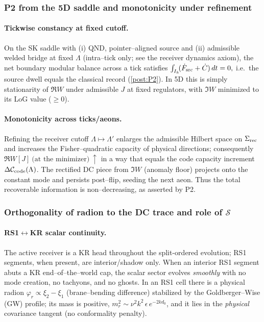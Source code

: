 \documentclass[10pt]{article}
\theoremstyle{definition}
\theoremstyle{plain}
\begin{document}
\subsubsection*{P2 from the 5D saddle and monotonicity under refinement}
\label{subsubsec:P2-from-5D}

\paragraph{Tickwise constancy at fixed cutoff.}\label{par:uom-main-084}
On the SK saddle with (i) QND, pointer–aligned source and (ii) admissible welded bridge at fixed $\Lambda$
(intra--tick only; see the receiver dynamics axiom), the net boundary modular balance across a tick satisfies
\(
\int_{I_k}\! (\dot F_{\rm src}+\dot C)\,dt = 0,
\)
i.e.\ the source dwell equals the classical record (\ref{post:P2}).
In 5D this is simply stationarity of $\Re W$ under admissible $J$ at fixed regulators, with $\Im W$ minimized to its LoG value ($\ge 0$).

\paragraph{Monotonicity across ticks/aeons.}\label{par:uom-main-085}
Refining the receiver cutoff $\Lambda\mapsto\Lambda'$ enlarges the admissible Hilbert space on $\Sigma_{\rm rec}$ and increases the Fisher–quadratic capacity of physical directions; consequently
\(
\Re W[J]\ \text{(at the minimizer)}\ \uparrow
\)
in a way that equals the code capacity increment $\Delta\mathcal C_{\rm code}(\Lambda)$. 
The rectified DC piece from $\Im W$ (anomaly floor) projects onto the constant mode and persists post–flip, seeding the next aeon. Thus the total recoverable information is non–decreasing, as asserted by P2.

\subsubsection{Orthogonality of radion to the DC trace and role of \texorpdfstring{$\mathcal S$}{S}}
\label{subsubsec:radion-orth}

\paragraph{RS1$\leftrightarrow$KR scalar continuity.}\label{par:uom-main-086}
The active receiver is a KR head throughout the split-ordered evolution; RS1 segments, when present, are interior/shadow only.
When an interior RS1 segment abuts a KR end--of--the--world cap, the scalar sector evolves \emph{smoothly}
with no mode creation, no tachyons, and no ghosts. In an RS1 cell there is a physical radion
$\varphi_r\propto\xi_2-\xi_1$ (brane–bending difference) stabilized by the Goldberger–Wise (GW) profile; its mass is positive,
$m_r^2\sim \nu^2 k^2\,\epsilon\,e^{-2k d_0}$, and it lies in the \emph{physical} covariance tangent (no conformality penalty).
\end{document}
